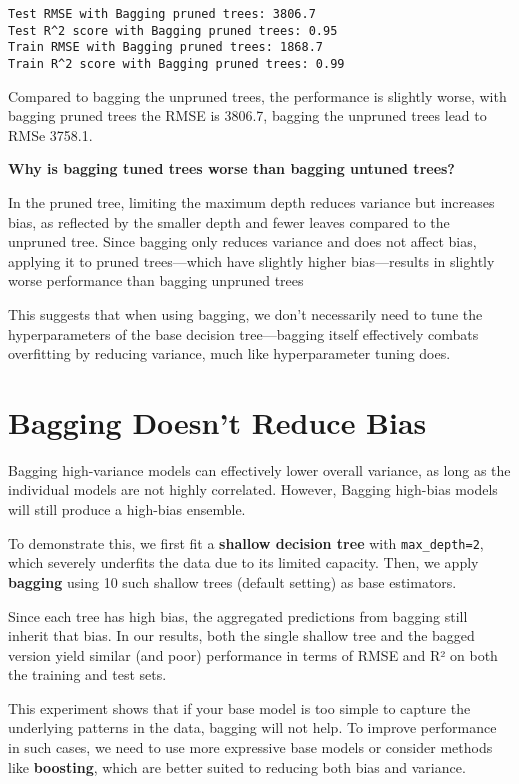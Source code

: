 \documentclass[
  letterpaper,
  DIV=11,
  numbers=noendperiod]{scrreprt}
\begin{document}
\begin{verbatim}
Test RMSE with Bagging pruned trees: 3806.7
Test R^2 score with Bagging pruned trees: 0.95
Train RMSE with Bagging pruned trees: 1868.7
Train R^2 score with Bagging pruned trees: 0.99
\end{verbatim}

Compared to bagging the unpruned trees, the performance is slightly
worse, with bagging pruned trees the RMSE is 3806.7, bagging the
unpruned trees lead to RMSe 3758.1.

\textbf{Why is bagging tuned trees worse than bagging untuned trees?}

In the pruned tree, limiting the maximum depth reduces variance but
increases bias, as reflected by the smaller depth and fewer leaves
compared to the unpruned tree. Since bagging only reduces variance and
does not affect bias, applying it to pruned trees---which have slightly
higher bias---results in slightly worse performance than bagging
unpruned trees

This suggests that when using bagging, we don't necessarily need to tune
the hyperparameters of the base decision tree---bagging itself
effectively combats overfitting by reducing variance, much like
hyperparameter tuning does.

\section{Bagging Doesn't Reduce Bias}\label{bagging-doesnt-reduce-bias}

Bagging high-variance models can effectively lower overall variance, as
long as the individual models are not highly correlated. However,
Bagging high-bias models will still produce a high-bias ensemble.

To demonstrate this, we first fit a \textbf{shallow decision tree} with
\texttt{max\_depth=2}, which severely underfits the data due to its
limited capacity. Then, we apply \textbf{bagging} using 10 such shallow
trees (default setting) as base estimators.

Since each tree has high bias, the aggregated predictions from bagging
still inherit that bias. In our results, both the single shallow tree
and the bagged version yield similar (and poor) performance in terms of
RMSE and R² on both the training and test sets.

This experiment shows that if your base model is too simple to capture
the underlying patterns in the data, bagging will not help. To improve
performance in such cases, we need to use more expressive base models or
consider methods like \textbf{boosting}, which are better suited to
reducing both bias and variance.
\end{document}
